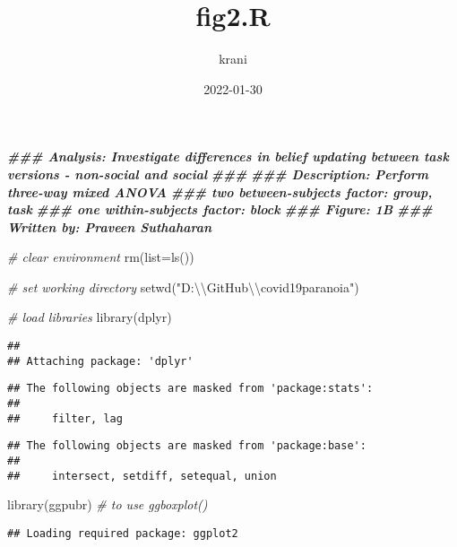 \documentclass[
]{article}
\title{fig2.R}
\author{krani}
\date{2022-01-30}
\newenvironment{Shaded}{\begin{snugshade}}{\end{snugshade}}
\newcommand{\AttributeTok}[1]{\textcolor[rgb]{0.77,0.63,0.00}{#1}}
\newcommand{\CommentTok}[1]{\textcolor[rgb]{0.56,0.35,0.01}{\textit{#1}}}
\newcommand{\DocumentationTok}[1]{\textcolor[rgb]{0.56,0.35,0.01}{\textbf{\textit{#1}}}}
\newcommand{\FunctionTok}[1]{\textcolor[rgb]{0.00,0.00,0.00}{#1}}
\newcommand{\NormalTok}[1]{#1}
\newcommand{\SpecialCharTok}[1]{\textcolor[rgb]{0.00,0.00,0.00}{#1}}
\newcommand{\StringTok}[1]{\textcolor[rgb]{0.31,0.60,0.02}{#1}}
\begin{document}
\maketitle

\begin{Shaded}
\begin{Highlighting}[]
\DocumentationTok{\#\#\# Analysis: Investigate differences in belief updating between task versions {-} non{-}social and social}
\DocumentationTok{\#\#\#}
\DocumentationTok{\#\#\# Description: Perform three{-}way mixed ANOVA}
\DocumentationTok{\#\#\#                 two between{-}subjects factor: group, task}
\DocumentationTok{\#\#\#                 one within{-}subjects factor: block}
\DocumentationTok{\#\#\# Figure: 1B}
\DocumentationTok{\#\#\# Written by: Praveen Suthaharan}

\CommentTok{\# clear environment}
\FunctionTok{rm}\NormalTok{(}\AttributeTok{list=}\FunctionTok{ls}\NormalTok{())}

\CommentTok{\# set working directory}
\FunctionTok{setwd}\NormalTok{(}\StringTok{"D:}\SpecialCharTok{\textbackslash{}\textbackslash{}}\StringTok{GitHub}\SpecialCharTok{\textbackslash{}\textbackslash{}}\StringTok{covid19paranoia"}\NormalTok{)}

\CommentTok{\# load libraries}
\FunctionTok{library}\NormalTok{(dplyr)}
\end{Highlighting}
\end{Shaded}

\begin{verbatim}
## 
## Attaching package: 'dplyr'
\end{verbatim}

\begin{verbatim}
## The following objects are masked from 'package:stats':
## 
##     filter, lag
\end{verbatim}

\begin{verbatim}
## The following objects are masked from 'package:base':
## 
##     intersect, setdiff, setequal, union
\end{verbatim}

\begin{Shaded}
\begin{Highlighting}[]
\FunctionTok{library}\NormalTok{(ggpubr) }\CommentTok{\# to use ggboxplot()}
\end{Highlighting}
\end{Shaded}

\begin{verbatim}
## Loading required package: ggplot2
\end{verbatim}
\end{document}
